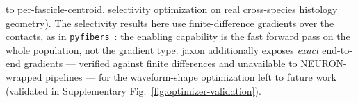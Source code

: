\begin{enumerate}
        to per-fascicle-centroid, selectivity optimization on real
        cross-species histology geometry).  The selectivity results here
        use finite-difference gradients over the contacts, as in
        \texttt{pyfibers}~\cite{marshall2025pyfibers}: the enabling capability is
        the fast forward pass on the whole population, not the gradient
        type.  jaxon additionally exposes \emph{exact} end-to-end
        gradients --- verified against finite differences and
        unavailable to NEURON-wrapped pipelines --- for the
        waveform-shape optimization left to future work
        (validated in Supplementary Fig.~\ref{fig:optimizer-validation}).
\end{enumerate}

